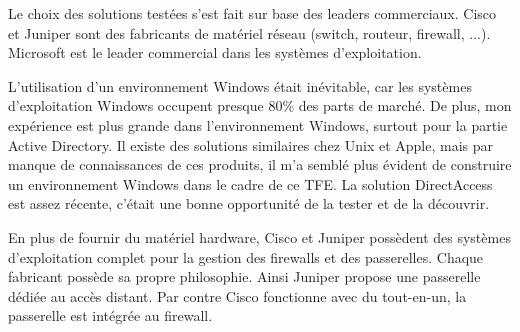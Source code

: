 Le choix des solutions testées s'est fait sur base des leaders commerciaux.
Cisco et Juniper sont des fabricants de matériel réseau (switch, routeur, firewall, ...).
Microsoft est le leader commercial dans les systèmes d'exploitation.

L'utilisation d'un environnement Windows était inévitable, car les systèmes d'exploitation Windows occupent presque 80\% des parts de marché.
De plus, mon expérience est plus grande dans l'environnement Windows, surtout pour la partie Active Directory.
Il existe des solutions similaires chez Unix et Apple, mais par manque de connaissances de ces produits, il m'a semblé plus évident de construire un environnement Windows dans le cadre de ce TFE.
La solution DirectAccess est assez récente, c'était une bonne opportunité de la tester et de la découvrir.

En plus de fournir du matériel hardware, Cisco et Juniper possèdent des systèmes d'exploitation complet pour la gestion des firewalls et des passerelles.
Chaque fabricant possède sa propre philosophie.
Ainsi Juniper propose une passerelle dédiée au accès distant.
Par contre Cisco fonctionne avec du tout-en-un, la passerelle est intégrée au firewall.